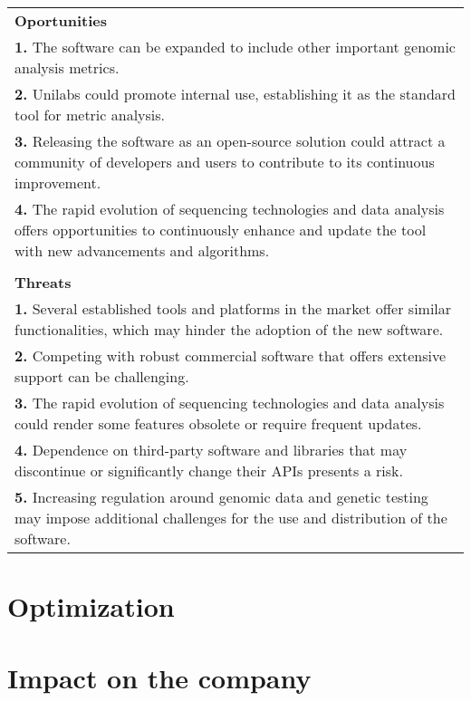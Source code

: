 \begin{table}[]
\begin{tabular}{p{\textwidth}}
    \rowcolor[HTML]{5CB195} 
    \textbf{Oportunities} \\ 
    \textbf{1.} The software can be expanded to include other important genomic analysis metrics. \\
    \textbf{2.} Unilabs could promote internal use, establishing it as the standard tool for metric analysis. \\
    \textbf{3.} Releasing the software as an open-source solution could attract a community of developers and users to contribute to its continuous improvement. \\
    \textbf{4.} The rapid evolution of sequencing technologies and data analysis offers opportunities to continuously enhance and update the tool with new advancements and algorithms. \\ \\
    \rowcolor[HTML]{E7422F} 
    \textbf{Threats} \\ 
    \textbf{1.} Several established tools and platforms in the market offer similar functionalities, which may hinder the adoption of the new software. \\
    \textbf{2.} Competing with robust commercial software that offers extensive support can be challenging. \\
    \textbf{3.} The rapid evolution of sequencing technologies and data analysis could render some features obsolete or require frequent updates. \\
    \textbf{4.} Dependence on third-party software and libraries that may discontinue or significantly change their APIs presents a risk. \\
    \textbf{5.} Increasing regulation around genomic data and genetic testing may impose additional challenges for the use and distribution of the software. \\ 
    \end{tabular}
    \end{table}

\section{Optimization}

\section{Impact on the company}